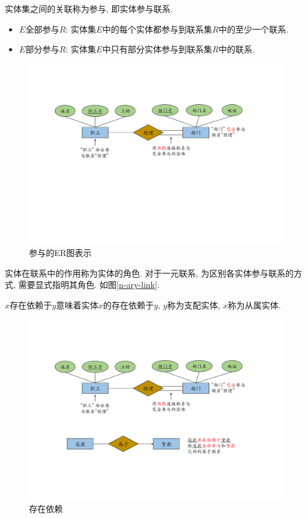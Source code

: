 \begin{definition}[参与 (Participation)]
    实体集之间的关联称为参与, 即实体参与联系.
    \begin{itemize}
        \item $E$全部参与$R$: 实体集$E$中的每个实体都参与到联系集$R$中的至少一个联系.
        \item $E$部分参与$R$: 实体集$E$中只有部分实体参与到联系集$R$中的联系.
    \end{itemize}
\end{definition}

\begin{figure}[H]
    \centering
    \includegraphics[width=.8\textwidth]{figure/参与.pdf}
    \caption{参与的ER图表示}
\end{figure}

\begin{definition}[角色 (Role)]
    实体在联系中的作用称为实体的角色. 对于一元联系, 为区别各实体参与联系的方式, 需要显式指明其角色. 如图\ref{n-ary-link}.
\end{definition}

\begin{definition}
    $x$存在依赖于$y$意味着实体$x$的存在依赖于$y$, $y$称为支配实体, $x$称为从属实体.
\end{definition}

\begin{figure}[H]
    \centering
    \includegraphics[width=.8\textwidth]{figure/存在依赖.pdf}
    \caption{存在依赖}
\end{figure}

